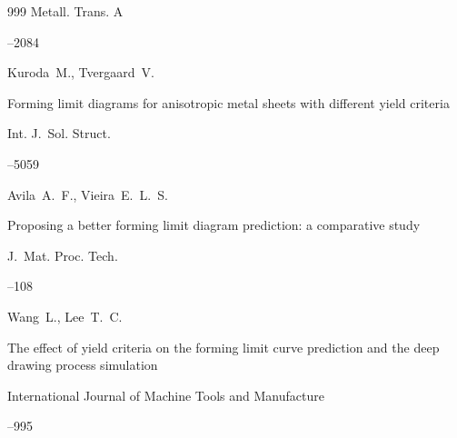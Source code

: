 \begin{thebibliography}{999}
\jour Metall. Trans. A




–2084






\by Kuroda~M., Tvergaard~V.  

\paper Forming limit diagrams for anisotropic metal sheets with different yield criteria

\jour Int. J.~Sol. Struct.




–5059






\by Avila~A.~F., Vieira~E.~L.~S.  

\paper Proposing a better forming limit diagram prediction: a comparative study

\jour J.~Mat. Proc. Tech.




–108






\by Wang~L., Lee~T.~C.  

\paper The effect of yield criteria on the forming limit curve prediction and the deep drawing process simulation

\jour International Journal of Machine Tools and Manufacture




–995






\end{thebibliography}
